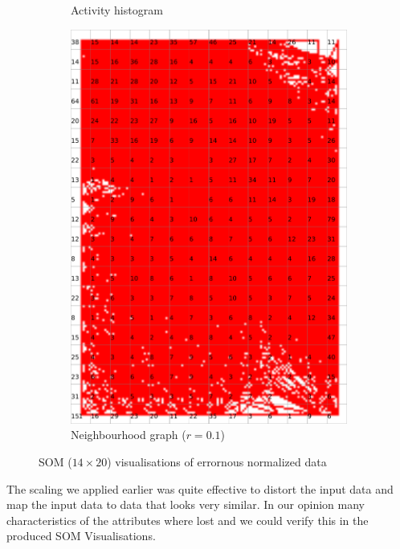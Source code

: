 \documentclass{acm_proc_article-sp}
\begin{document}
\begin{figure}
\begin{subfigure}[b]{0.45\linewidth}
        \caption{Activity histogram\\}
        \label{fig:wine-weird-activity-histogram}
    \end{subfigure}
    \begin{subfigure}[b]{0.45\linewidth}
        \includegraphics[width=\linewidth]{img/wine-weird-nearest-neighbour-radius}
        \caption{Neighbourhood graph ($r=0.1$)}
        \label{fig:wine-weird-nearest-neighbour-radius}
    \end{subfigure}
    \caption{SOM ($14\times20$) visualisations of errornous normalized data}
\end{figure}

The scaling we applied earlier was quite effective to distort the input data
and map the input data to data that looks very similar. In our opinion
many characteristics of the attributes where lost and we could verify this
in the produced SOM Visualisations.
\end{document}
